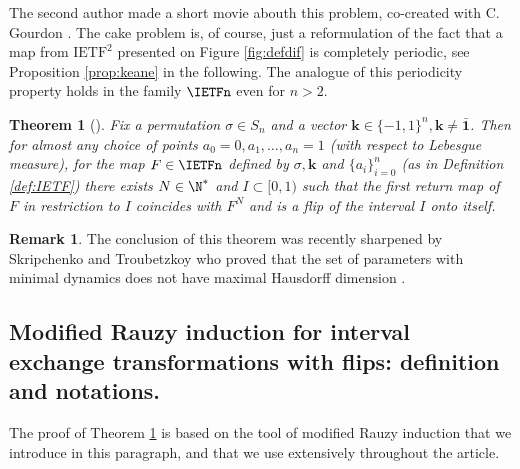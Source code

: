 \documentclass[12pt]{article}
\newtheorem{theorem}{Theorem}
\theoremstyle{definition}
\newtheorem*{remark}{Remark}
\begin{document}

The second author made a short movie abouth this problem, co-created with C. Gourdon \cite{GPR} . The cake problem is, of course, just a reformulation of the fact that a map from $\mathrm{IETF}^2$ presented on Figure \ref{fig:defdif} is completely periodic, see Proposition \ref{prop:keane} in the following.  The analogue of this periodicity property holds in the family $\IETFn$ even for $n>2$.

\begin{theorem}[\cite{N89}]\label{thm:Nogueira}
Fix a permutation $\sigma \in S_n$ and a vector $\textbf{k} \in \{-1,1\}^n, \textbf{k} \neq \boldsymbol{\bar{1}}$. Then for almost any choice of points $a_0=0, a_1, \ldots, a_n=1$ (with respect to Lebesgue measure), for the map $F \in \IETFn$ defined by $\sigma, \textbf{k}$ and $\{a_i\}_{i=0}^n$ (as in Definition \ref{def:IETF}) there exists $N\in \N^*$ and $I \subset [0,1)$ such that the first return map of $F$ in restriction to $I$ coincides with $F^N$ and is a flip of the interval $I$ onto itself.
\end{theorem}

\begin{remark} The conclusion of this theorem was recently sharpened by Skripchenko and Troubetzkoy who proved that the set of parameters with minimal dynamics  does not have maximal Hausdorff dimension \cite{ST18}. 

\end{remark}


\subsection{Modified Rauzy induction for interval exchange transformations with flips: definition and notations.}\label{subs:MRI}
The proof of Theorem \ref{thm:Nogueira} is based on the tool of modified Rauzy induction that we introduce in this paragraph, and that we use extensively throughout the article. 
\end{document}
